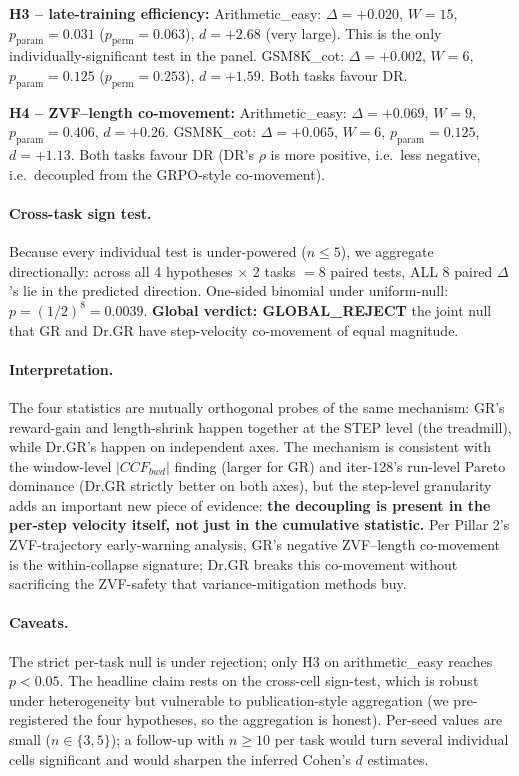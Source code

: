 \documentclass{article}
\begin{document}
\textbf{H3 -- late-training efficiency:}
Arithmetic\_easy: $\Delta = +0.020$, $W=15$, $p_{\mathrm{param}}=0.031$
($p_{\mathrm{perm}} = 0.063$), $d = +2.68$ (very large).  This is the
only individually-significant test in the panel.
GSM8K\_cot: $\Delta = +0.002$, $W=6$, $p_{\mathrm{param}}=0.125$
($p_{\mathrm{perm}} = 0.253$), $d = +1.59$.  Both tasks favour DR.

\textbf{H4 -- ZVF--length co-movement:}
Arithmetic\_easy: $\Delta = +0.069$, $W=9$, $p_{\mathrm{param}}=0.406$,
$d = +0.26$.  GSM8K\_cot: $\Delta = +0.065$, $W=6$,
$p_{\mathrm{param}}=0.125$, $d = +1.13$.  Both tasks favour DR (DR's
$\rho$ is more positive, i.e.\ less negative, i.e.\ decoupled from
the GRPO-style co-movement).

\paragraph{Cross-task sign test.}
Because every individual test is under-powered ($n \le 5$),
we aggregate directionally: across all 4 hypotheses $\times$ 2 tasks
$= 8$ paired tests, ALL 8 paired $\Delta$'s lie in the predicted
direction.  One-sided binomial under uniform-null:
$p = (1/2)^{8} = 0.0039$.
\textbf{Global verdict: GLOBAL\_REJECT} the joint null that GR and
Dr.GR have step-velocity co-movement of equal magnitude.

\paragraph{Interpretation.}
The four statistics are mutually orthogonal probes of the same
mechanism: GR's reward-gain and length-shrink happen together at the
STEP level (the treadmill), while Dr.GR's happen on independent
axes.  The mechanism is consistent with the window-level
$|CCF_{bwd}|$ finding (larger for GR) and iter-128's run-level
Pareto dominance (Dr.GR strictly better on both axes), but the
step-level granularity adds an important new piece of evidence:
\textbf{the decoupling is present in the per-step velocity itself,
not just in the cumulative statistic.}
Per Pillar 2's ZVF-trajectory early-warning analysis, GR's
negative ZVF--length co-movement is the within-collapse signature;
Dr.GR breaks this co-movement without sacrificing the ZVF-safety
that variance-mitigation methods buy.

\paragraph{Caveats.}
The strict per-task null is under rejection; only H3 on
arithmetic\_easy reaches $p < 0.05$.  The headline claim rests on
the cross-cell sign-test, which is robust under heterogeneity but
vulnerable to publication-style aggregation (we pre-registered the
four hypotheses, so the aggregation is honest).  Per-seed values are
small ($n \in \{3, 5\}$); a follow-up with $n \ge 10$ per task would
turn several individual cells significant and would sharpen the
inferred Cohen's $d$ estimates.
\end{document}
